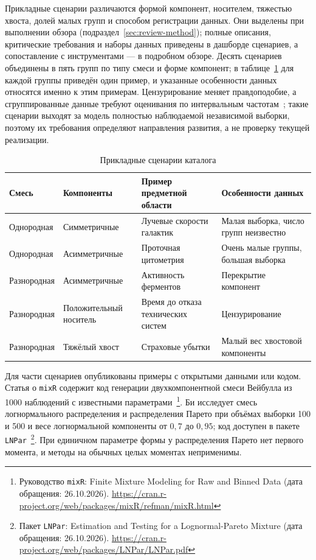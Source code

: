 Прикладные сценарии различаются формой компонент, носителем, тяжестью хвоста, долей малых групп и способом регистрации данных. Они выделены при выполнении обзора (подраздел~\ref{sec:review-method}); полные описания, критические требования и наборы данных приведены в дашборде сценариев, а сопоставление с инструментами --- в подробном обзоре. Десять сценариев объединены в пять групп по типу смеси и форме компонент; в таблице~\ref{tab:scenarios} для каждой группы приведён один пример, и указанные особенности данных относятся именно к этим примерам. Цензурирование меняет правдоподобие, а сгруппированные данные требуют оценивания по интервальным частотам~\cite{Yu2022}; такие сценарии выходят за модель полностью наблюдаемой независимой выборки, поэтому их требования определяют направления развития, а не проверку текущей реализации.

\begin{table}[!ht]
    \centering
    \small
    \renewcommand{\arraystretch}{1.2}
    \caption{Прикладные сценарии каталога}\label{tab:scenarios}
    \begin{tabularx}{\textwidth}{@{}>{\raggedright\arraybackslash}p{}>{\raggedright\arraybackslash}p{}>{\raggedright\arraybackslash}p{}>{\raggedright\arraybackslash}X@{}}
        \toprule
        \textbf{Смесь} & \textbf{Компоненты} & \textbf{Пример предметной области} & \textbf{Особенности данных}\\
        \midrule
        Однородная & Симметричные & Лучевые скорости галактик & Малая выборка, число групп неизвестно\\
        Однородная & Асимметричные & Проточная цитометрия & Очень малые группы, большая выборка\\
        Разнородная & Асимметричные & Активность ферментов & Перекрытие компонент\\
        Разнородная & Положительный носитель & Время до отказа технических систем & Цензурирование\\
        Разнородная & Тяжёлый хвост & Страховые убытки & Малый вес хвостовой компоненты\\
        \bottomrule
    \end{tabularx}
\end{table}

Для части сценариев опубликованы примеры с открытыми данными или кодом. Статья о \texttt{mixR} содержит код генерации двухкомпонентной смеси Вейбулла из 1000 наблюдений с известными параметрами~\cite{Yu2022}\footnote{Руководство \texttt{mixR}: Finite Mixture Modeling for Raw and Binned Data (дата обращения: 26.10.2026). \url{https://cran.r-project.org/web/packages/mixR/refman/mixR.html}}. Би исследует смесь логнормального распределения и распределения Парето при объёмах выборки 100 и 500 и весе логнормальной компоненты от $0{,}7$ до $0{,}95$; код доступен в пакете \texttt{LNPar}~\cite{Bee2026}\footnote{Пакет \texttt{LNPar}: Estimation and Testing for a Lognormal-Pareto Mixture (дата обращения: 26.10.2026). \url{https://cran.r-project.org/web/packages/LNPar/LNPar.pdf}}. При единичном параметре формы у распределения Парето нет первого момента, и методы на обычных целых моментах неприменимы.

